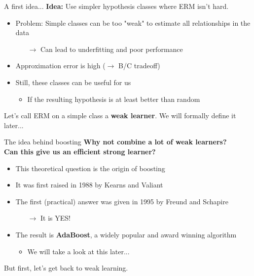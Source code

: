 \begin{frame}{A first idea...}
    \textbf{Idea:} Use simpler hypothesis classes where ERM isn't hard.
    \begin{itemize}
        \item Problem: Simple classes can be too "weak" to estimate all relationships in the data
        \begin{itemize}
            \item[$\rightarrow$] Can lead to underfitting and poor performance
        \end{itemize}
        \item Approximation error is high ($\rightarrow$ B/C tradeoff)
        \item Still, these classes can be useful for us
        \begin{itemize}
            \item If the resulting hypothesis is at least better than random
        \end{itemize}
    \end{itemize}
    Let's call ERM on a simple class a \textbf{weak learner}. We will formally define it later...
\end{frame}

\begin{frame}{The idea behind boosting}
    \textbf{Why not combine a lot of weak learners?}\\
    \textbf{Can this give us an efficient strong learner?}
    \begin{itemize}
        \item This theoretical question is the origin of boosting
        \item It was first raised in 1988 by Kearns and Valiant~\cite{kv-lbffahf-88}
        \item The first (practical) answer was given in 1995 by Freund and Schapire~\cite{FREUND1997119}
        \begin{itemize}
            \item[$\rightarrow$] It is YES!
        \end{itemize}
        \item The result is \textbf{AdaBoost}, a widely popular and award winning algorithm
        \begin{itemize}
            \item We will take a look at this later...
        \end{itemize}
    \end{itemize}
    But first, let's get back to weak learning.
\end{frame}